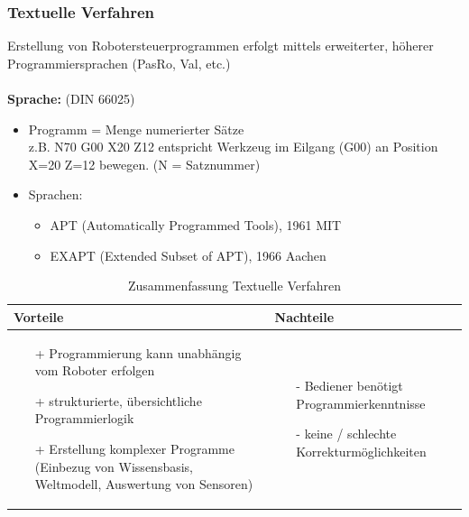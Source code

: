 \subsubsection{Textuelle Verfahren}
Erstellung von Robotersteuerprogrammen erfolgt mittels erweiterter,
höherer Programmiersprachen (PasRo, Val, etc.)
\\ \\
\textbf{Sprache:} (DIN 66025)
\begin{itemize}
\item Programm = Menge numerierter Sätze\\
z.B. \glqq N70 G00 X20 Z12\grqq{} entspricht Werkzeug im Eilgang (G00) an Position X=20 Z=12 bewegen. (N = Satznummer)
\item Sprachen:
\begin{itemize}
\item APT (Automatically Programmed Tools), 1961 MIT
\item EXAPT (Extended Subset of APT), 1966 Aachen
\end{itemize}
\end{itemize}

\begin{table}[!h]
\centering
\begin{tabular}{|p{7.5cm}|p{7.5cm}|}
\hline
Vorteile & Nachteile\\
\hline
\vspace{-5mm}
\begin{itemize}
\setlength\itemsep{0em}
\item[+] Programmierung kann unabhängig vom Roboter erfolgen
\item[+] strukturierte, übersichtliche Programmierlogik
\item[+] Erstellung komplexer Programme (Einbezug von Wissensbasis,
Weltmodell, Auswertung von Sensoren)
\end{itemize}
 &
 \vspace{-5mm}
\begin{itemize}
\setlength\itemsep{0em}
\item[-] Bediener benötigt Programmierkenntnisse
\item[-] keine / schlechte Korrekturmöglichkeiten
\end{itemize}\\
\hline
\end{tabular}
\caption{Zusammenfassung Textuelle Verfahren}
\label{tab:textprog}
\end{table}
